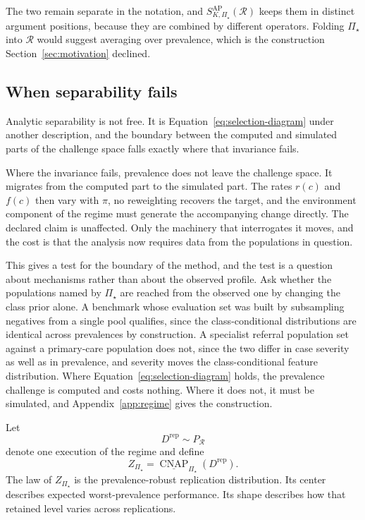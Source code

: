 \documentclass[11pt]{article}
\newcommand{\CNAP}{\operatorname{CNAP}}
\newcommand{\Regime}{\mathcal{R}}
\newcommand{\PSet}{\Pi_\star}
\newcommand{\RobCNAP}{\underline{\CNAP}_{\PSet}}
\theoremstyle{remark}
\begin{document}
The two remain separate in the notation, and $S_{K,\PSet}^{\mathrm{AP}}(\Regime)$ keeps them in distinct argument positions, because they are combined by different operators. Folding $\PSet$ into $\Regime$ would suggest averaging over prevalence, which is the construction Section~\ref{sec:motivation} declined.

\subsection{When separability fails}
\label{sec:separability}

Analytic separability is not free. It is Equation~\eqref{eq:selection-diagram} under another description, and the boundary between the computed and simulated parts of the challenge space falls exactly where that invariance fails.

Where the invariance fails, prevalence does not leave the challenge space. It migrates from the computed part to the simulated part. The rates $r(c)$ and $f(c)$ then vary with $\pi$, no reweighting recovers the target, and the environment component of the regime must generate the accompanying change directly. The declared claim is unaffected. Only the machinery that interrogates it moves, and the cost is that the analysis now requires data from the populations in question.

This gives a test for the boundary of the method, and the test is a question about mechanisms rather than about the observed profile. Ask whether the populations named by $\PSet$ are reached from the observed one by changing the class prior alone. A benchmark whose evaluation set was built by subsampling negatives from a single pool qualifies, since the class-conditional distributions are identical across prevalences by construction. A specialist referral population set against a primary-care population does not, since the two differ in case severity as well as in prevalence, and severity moves the class-conditional feature distribution. Where Equation~\eqref{eq:selection-diagram} holds, the prevalence challenge is computed and costs nothing. Where it does not, it must be simulated, and Appendix~\ref{app:regime} gives the construction.

Let
\[
D^{\mathrm{rep}}\sim P_{\Regime}
\]
denote one execution of the regime and define
\begin{equation}
Z_{\PSet}
=
\RobCNAP(D^{\mathrm{rep}}).
\label{eq:robust-replication-effect}
\end{equation}
The law of $Z_{\PSet}$ is the prevalence-robust replication distribution. Its center describes expected worst-prevalence performance. Its shape describes how that retained level varies across replications.
\end{document}
